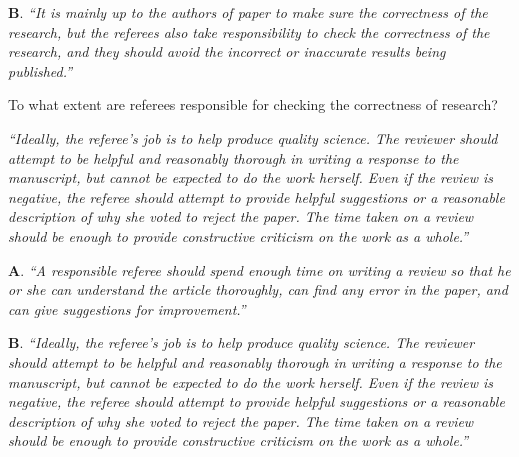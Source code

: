 \documentclass[portrait,11pt]{seminar}
\begin{document}
\medskip

{\bf B}. {\it ``It is mainly up to the authors of paper to make sure the correctness of the research, but the referees also take responsibility to check the correctness of the research, and they should avoid the incorrect or inaccurate results being published.''}

\es
\bs  To what extent are referees responsible for checking the correctness of research? 


{\it ``Ideally, the referee’s job is to help produce quality science. The reviewer should attempt to be helpful and reasonably thorough in writing a response to the manuscript, but cannot be expected to do the work herself. Even if the review is negative, the referee should attempt to provide helpful suggestions or a reasonable description of why she voted to reject the paper. The time taken on a review should be enough to provide constructive criticism on the work as a whole.''}









\es {}

{\bf A}. {\it  ``A responsible referee should spend enough time on writing a review so that he or she can understand the article thoroughly, can find any error in the paper, and can give suggestions for improvement.''}

\medskip

{\bf B}. {\it ``Ideally, the referee’s job is to help produce quality science. The reviewer should attempt to be helpful and reasonably thorough in writing a response to the manuscript, but cannot be expected to do the work herself. Even if the review is negative, the referee should attempt to provide helpful suggestions or a reasonable description of why she voted to reject the paper. The time taken on a review should be enough to provide constructive criticism on the work as a whole.''}
\end{document}

